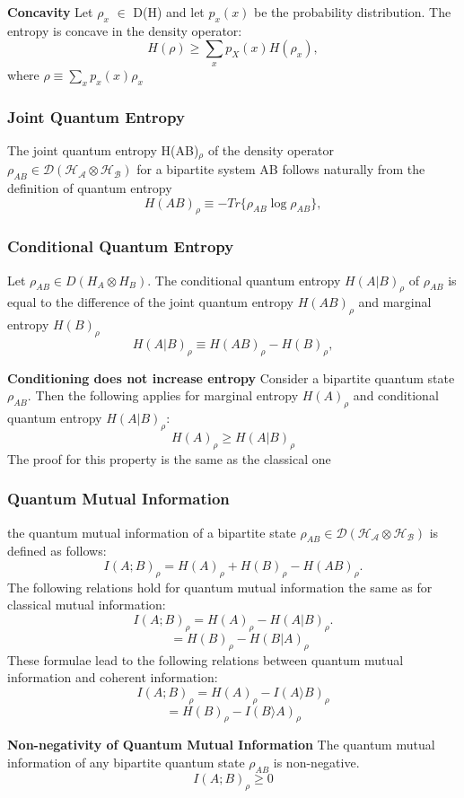 \textbf{Concavity}
Let $\rho_x$ $\in$ D(H) and let $p_x(x)$ be the probability distribution. The entropy is concave in the density operator:
\[
H(\rho) \geq \sum_x p_X(x) H(\rho_x),
\]
where $\rho \equiv \sum_xp_x(x)\rho_x$

\subsubsection{Joint Quantum Entropy}
The joint quantum entropy H(AB)$_\rho$ of the density operator $\rho_{AB} \in \mathcal{D}(\mathcal{H_A} \otimes \mathcal{H_B}) $ for a bipartite system AB follows naturally from the definition of quantum entropy
\[
H(AB)_\rho \equiv -Tr\{\rho_{AB} \log \rho_{AB}\},
\]


\subsubsection{Conditional Quantum Entropy}
Let $\rho_{AB} \in D(H_A \otimes H_B)$. The conditional quantum entropy $H(A|B)_\rho$ of $\rho_{AB}$ is equal to the difference of the joint quantum entropy $H(AB)_\rho$ and marginal entropy $H(B)_\rho$
\[
H(A|B)_\rho \equiv H(AB)_\rho - H(B)_\rho,
\]

\textbf{Conditioning does not increase entropy}
Consider a bipartite quantum state $\rho_{AB}$. Then the following applies for marginal entropy $H(A)_\rho$ and conditional quantum entropy $H(A|B)_\rho$:
\[
H(A)_\rho \geq H(A|B)_\rho
\]
The proof for this property is the same as the classical one


\subsubsection{Quantum Mutual Information}
the quantum mutual information of a bipartite state $\rho_{AB} \in \mathcal{D}(\mathcal{H_A} \otimes \mathcal{H_B})$ is defined as follows:
\[
I(A;B)_\rho = H(A)_\rho + H(B)_\rho - H(AB)_\rho.
\]
The following relations hold for quantum mutual information the same as for classical mutual information:
\[
I(A;B)_\rho = H(A)_\rho - H(A|B)_\rho.
\]
\[
            \quad = H(B)_\rho - H(B|A)_\rho
\]
These formulae lead to the following relations between quantum mutual information and coherent information:
\[
I(A;B)_\rho = H(A)_\rho - I(A\rangle{}B)_\rho
\]
\[
 = H(B)_\rho - I(B\rangle{}A)_\rho
\]

\textbf{Non-negativity of Quantum Mutual Information}
The quantum mutual information of any bipartite quantum state $\rho_{AB}$ is non-negative.
\[
I(A;B)_\rho \geq 0
\]


